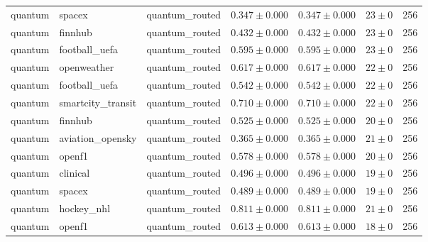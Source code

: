 \begin{table}[htbp]
\begin{tabular}{l l l r r r r}
quantum & spacex & quantum\_routed & $0.347\pm0.000$ & $0.347\pm0.000$ & $23\pm0$ & 256 \\
quantum & finnhub & quantum\_routed & $0.432\pm0.000$ & $0.432\pm0.000$ & $23\pm0$ & 256 \\
quantum & football\_uefa & quantum\_routed & $0.595\pm0.000$ & $0.595\pm0.000$ & $23\pm0$ & 256 \\
quantum & openweather & quantum\_routed & $0.617\pm0.000$ & $0.617\pm0.000$ & $22\pm0$ & 256 \\
quantum & football\_uefa & quantum\_routed & $0.542\pm0.000$ & $0.542\pm0.000$ & $22\pm0$ & 256 \\
quantum & smartcity\_transit & quantum\_routed & $0.710\pm0.000$ & $0.710\pm0.000$ & $22\pm0$ & 256 \\
quantum & finnhub & quantum\_routed & $0.525\pm0.000$ & $0.525\pm0.000$ & $20\pm0$ & 256 \\
quantum & aviation\_opensky & quantum\_routed & $0.365\pm0.000$ & $0.365\pm0.000$ & $21\pm0$ & 256 \\
quantum & openf1 & quantum\_routed & $0.578\pm0.000$ & $0.578\pm0.000$ & $20\pm0$ & 256 \\
quantum & clinical & quantum\_routed & $0.496\pm0.000$ & $0.496\pm0.000$ & $19\pm0$ & 256 \\
quantum & spacex & quantum\_routed & $0.489\pm0.000$ & $0.489\pm0.000$ & $19\pm0$ & 256 \\
quantum & hockey\_nhl & quantum\_routed & $0.811\pm0.000$ & $0.811\pm0.000$ & $21\pm0$ & 256 \\
quantum & openf1 & quantum\_routed & $0.613\pm0.000$ & $0.613\pm0.000$ & $18\pm0$ & 256 \\
\hline
\end{tabular}
\end{table}
